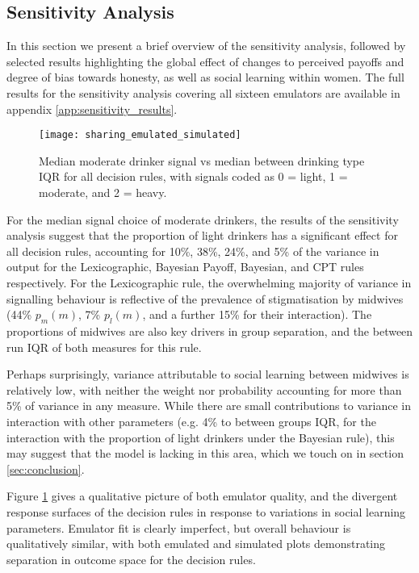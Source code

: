\subsection{Sensitivity Analysis}
\label{sub:sa_results}

In this section we present a brief overview of the sensitivity analysis, followed by selected results highlighting the global effect of changes to perceived payoffs and degree of bias towards honesty, as well as social learning within women. The full results for the sensitivity analysis covering all sixteen emulators are available in appendix \ref{app:sensitivity_results}.

\begin{figure}[H]
\texttt{[image: sharing\_emulated\_simulated]}
\caption{Median moderate drinker signal vs median between drinking type IQR for all decision rules, with signals coded as 0 = light, 1 = moderate, and 2 = heavy.}
\label{fig:outcome_plots}
\end{figure}

For the median signal choice of moderate drinkers, the results of the sensitivity analysis suggest that the proportion of light drinkers has a significant effect for all decision rules, accounting for 10\%, 38\%, 24\%, and 5\% of the variance in output for the Lexicographic, Bayesian Payoff, Bayesian, and \ac{CPT} rules respectively. For the Lexicographic rule, the overwhelming majority of variance in signalling behaviour is reflective of the prevalence of stigmatisation by midwives (44\% \(p_{m}(m)\), 7\% \(p_{l}(m)\), and a further 15\% for their interaction).  The proportions of midwives are also key drivers in group separation, and the between run IQR of both measures for this rule. 

Perhaps surprisingly, variance attributable to social learning between midwives is relatively low, with neither the weight nor probability accounting for more than 5\% of variance in any measure. While there are small contributions to variance in interaction with other parameters (e.g. 4\% to between groups IQR, for the interaction with the proportion of light drinkers under the Bayesian rule), this may suggest that the model is lacking in this area, which we touch on in section \ref{sec:conclusion}.

Figure \ref{fig:outcome_plots} gives a qualitative picture of both emulator quality, and the divergent response surfaces of the decision rules in response to variations in social learning parameters. Emulator fit is clearly imperfect, but overall behaviour is qualitatively similar, with both emulated and simulated plots demonstrating separation in outcome space for the decision rules.


